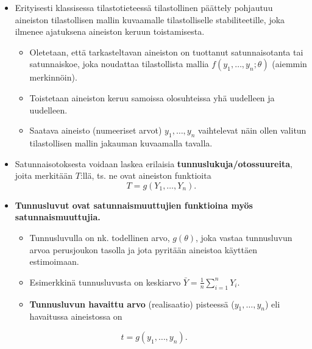 \documentclass[
]{book}
\providecommand{\tightlist}{%
  \setlength{\itemsep}{0pt}\setlength{\parskip}{0pt}}
\begin{document}
\begin{itemize}
\item
  Erityisesti klassisessa tilastotieteessä tilastollinen päättely pohjautuu aineiston tilastollisen mallin kuvaamalle tilastolliselle stabiliteetille, joka ilmenee ajatuksena aineiston keruun toistamisesta.

  \begin{itemize}
  \tightlist
  \item
    Oletetaan, että tarkasteltavan aineiston on tuottanut satunnaisotanta tai satunnaiskoe, joka noudattaa tilastollista mallia \(f(y_1, \ldots, y_n; \theta)\) (aiemmin merkinnöin).
  \item
    Toistetaan aineiston keruu samoissa olosuhteissa yhä uudelleen ja uudelleen.
  \item
    Saatava aineisto (numeeriset arvot) \(y_1, \ldots, y_n\) vaihtelevat näin ollen valitun tilastollisen mallin jakauman kuvaamalla tavalla.
  \end{itemize}
\item
  Satunnaisotoksesta voidaan laskea erilaisia \textbf{tunnuslukuja/otossuureita}, joita merkitään \(T\):llä, ts. ne ovat aineiston funktioita
  \[
  T = g(Y_1, \ldots, Y_n).
  \]
\item
  \textbf{Tunnusluvut ovat satunnaismuuttujien funktioina myös satunnaismuuttujia.}

  \begin{itemize}
  \tightlist
  \item
    Tunnusluvulla on nk. todellinen arvo, \(g(\theta)\), joka vastaa tunnusluvun arvoa perusjoukon tasolla ja jota pyritään aineistoa käyttäen estimoimaan.
  \item
    Esimerkkinä tunnusluvusta on keskiarvo \(\bar{Y} = \frac{1}{n} \sum_{i=1}^{n} Y_i\).
  \item
    \textbf{Tunnusluvun havaittu arvo} (realisaatio) pisteessä (\(y_1,\ldots, y_n\)) eli havaitussa aineistossa on
  \end{itemize}
\end{itemize}

\[
t = g(y_1, \ldots, y_n).
\]
\end{document}
